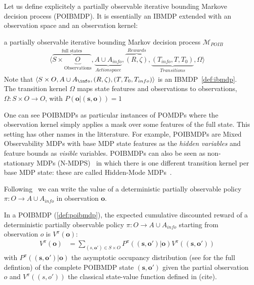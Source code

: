 Let us define explicitely a partially observable iterative bounding Markove decision process (POIBMDP). It is essentially an IBMDP extended with an observation space and an observation kernel:
\begin{definition}\label{def:poibmdp} a partially observable iterative bounding Markov decision process $\mathcal{M}_{POIB}$
    \begin{align*}
        \langle \overbrace{S\times \underbrace{O}_{\text{Observations}}}^{\text{full states}}, \underbrace{A\cup A_{info}}_{Action space}, \overbrace{(R, \zeta)}^{Rewards}, \underbrace{(T_{info}, T, T_0)}_{Transitions}, \Omega \rangle
    \end{align*}
    Note that $\langle S\times O, A\cup A_{\info}, (R, \zeta),( T, T_0, T_{info})\rangle$ is an IBMDP~\ref{def:ibmdp}.
    The transition kernel $\Omega$ maps state features and observations to observations, $\Omega:S\times O \rightarrow O$, with $P(\boldsymbol{o}|(\boldsymbol{s}, \boldsymbol{o}))=1$ 
\end{definition}

One can see POIBMDPs as particular instances of POMDPs where the observation kernel simply applies a mask over some features of the full state.
This setting has other names in the litterature.
For example, POIBMDPs are Mixed Observability MDPs \cite{momdp} with base MDP state features as the \textit{hidden variables} and feature bounds as \textit{visible} variables.
POIBMDPs can also be seen as non-stationary MDPs (N-MDPS)~\cite{learning-pomdp} in which there is one different transition kernel per base MDP state: these are called Hidden-Mode MDPs~\cite{hmmdp}. 

Following~\cite{learning-pomdp} we can write the value of a deterministic partially observable policy $\pi:O\rightarrow A\cup A_{info}$ in observation $\boldsymbol{o}$.

\begin{definition}\label{def:vpo} In a POIBMDP (\ref{def:poibmdp}), the expected cumulative discounted reward of a deterministic partially observable policy $\pi:O\rightarrow A\cup A_{info}$ starting from observation $o$ is $V^{\pi}(\boldsymbol{o})$:
    \begin{align*}
        V^{\pi}(\boldsymbol{o}) &= \underset{(s,\boldsymbol{o}')\in S\times O}{\sum}P^{\pi}((\boldsymbol{s}, \boldsymbol{o}')|\boldsymbol{o})V^{\pi}((\boldsymbol{s}, \boldsymbol{o}'))
    \end{align*}
with $P^{\pi}((\boldsymbol{s}, \boldsymbol{o}')|\boldsymbol{o})$ the asymptotic occupancy distribution (see \cite[Section 4]{learning-pomdp} for the full defintion) of the complete POIBMDP state $(\boldsymbol{s},\boldsymbol{o}')$ given the partial observation $o$ and $V^{\pi}((s, o'))$ the classical state-value function defined in (cite).
\end{definition}

